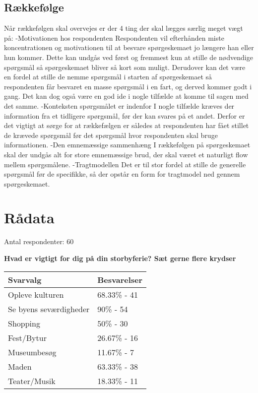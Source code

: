 \subsection{Rækkefølge}
Når rækkefølgen skal overvejes er der 4 ting der skal lægges særlig meget vægt på: 
-Motivationen hos respondenten
Respondenten vil efterhånden miste koncentrationen og motivationen til at besvare spørgeskemaet jo længere han eller hun kommer. Dette kan undgås ved først og fremmest kun at stille de nødvendige spørgsmål så spørgeskemaet bliver så kort som muligt. Derudover kan det være en fordel at stille de nemme spørgsmål i starten af spørgeskemaet så respondenten får besvaret en masse spørgsmål i en fart, og derved kommer godt i gang. Det kan dog også være en god ide i nogle tilfælde at komme til sagen med det samme.
-Konteksten spørgsmålet er indenfor 
I nogle tilfælde kræves der information fra et tidligere spørgsmål, før der kan svares på et andet. Derfor er det vigtigt at sørge for at rækkefælgen er således at respondenten har fået stillet de krævede spørgsmål før det spørgsmål hvor respondenten skal bruge informationen.
-Den emnemæssige sammenhæng 
I rækkefølgen på spørgeskemaet skal der undgås alt for store emnemæssige brud, der skal været et naturligt flow mellem spørgsmålene.
-Tragtmodellen
Det er til stor fordel at stille de generelle spørgsmål før de specifikke, så der opstår en form for tragtmodel ned gennem spørgeskemaet.


\section{Rådata}
Antal respondenter: 60

\textbf{Hvad er vigtigt for dig på din storbyferie?
Sæt gerne flere krydser}

    \begin{tabular}{| l | l |}
    \hline
    Svarvalg & Besvarelser \\ \hline
    Opleve kulturen & 68.33\% - 41 \\ \hline
    Se byens seværdigheder & 90\% - 54 \\ \hline
    Shopping & 50\% - 30 \\ \hline
    Fest/Bytur & 26.67\% - 16 \\ \hline
    Museumbesøg & 11.67\% - 7 \\ \hline
    Maden & 63.33\% - 38 \\ \hline
    Teater/Musik & 18.33\% - 11 \\
    \hline
    \end{tabular}


